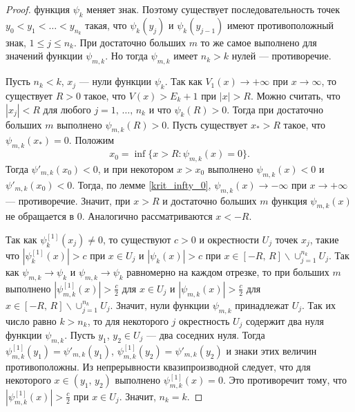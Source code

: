 \documentclass[a4paper
]{article}
\begin{document}
\begin{proof}
функция $\psi_k$ меняет знак. Поэтому существует последовательность
точек $y_0<y_1<\dots<y_{n_k}$ такая, что $\psi_k(y_j)$ и $\psi_k(y_{j-1})$
имеют противоположный знак, $1\le j\le n_k$. При достаточно больших
$m$ то же самое выполнено для значений функции $\psi_{m,k}$. Но тогда
$\psi_{m,k}$ имеет $n_k>k$ нулей --- противоречие. \par
Пусть $n_k<k$, $x_j$ --- нули функции $\psi_k$. Так как $V_1(x)
\rightarrow +\infty$ при $x\rightarrow \infty$, то существует $R>0$
такое, что $V(x)>E_k+1$ при $|x|>R$. Можно считать, что $|x_j|<R$
для любого $j=1, \, \dots, \, n_k$ и что $\psi_k(R)>0$. Тогда при
достаточно больших $m$ выполнено $\psi_{m,k}(R)>0$. Пусть существует
$x_*>R$ такое, что $\psi_{m,k}(x_*)=0$. Положим $$x_0=\inf\{x>R:
\psi _{m,k}(x)=0\}.$$ Тогда $\psi'_{m,k}(x_0)<0$, и при некотором
$x>x_0$ выполнено $\psi_{m,k}(x)<0$ и $\psi'_{m,k}(x_0)<0$.
Тогда, по лемме \ref{krit_infty_0}, $\psi_{m,k}(x)\rightarrow -\infty$ при
$x\rightarrow +\infty$ --- противоречие. Значит, при $x>R$ и
достаточно больших $m$ функция $\psi_{m,k}(x)$ не обращается в 0.
Аналогично рассматриваются $x<-R$. \par
Так как $\psi_k^{[1]}(x_j)\ne 0$, то существуют $c>0$ и окрестности
$U_j$ точек $x_j$, такие что $|\psi_k^{[1]}(x)|>c$ при $x\in U_j$ и
$|\psi_k(x)|>c$ при $x\in [-R, \, R]\backslash \cup_{j=1}^{n_k}U_j$.
Так как $\psi_{m,k}\rightarrow \psi_k$ и $\psi_{m,k}\rightarrow
\psi_k$ равномерно на каждом отрезке, то при больших $m$ выполнено
$|\psi_{m,k}^{[1]}(x)|>\frac{c}{2}$ для $x\in U_j$ и $|\psi_{m,k}(x)|
>\frac{c}{2}$ для $x\in [-R, \, R]\backslash \cup_{j=1}^{n_k}U_j$.
Значит, нули функции $\psi_{m,k}$ принадлежат $U_j$. Так их число
равно $k>n_k$, то для некоторого $j$ окрестность $U_j$ содержит два
нуля функции $\psi_{m,k}$. Пусть $y_1$, $y_2\in U_j$ --- два соседних
нуля. Тогда $\psi^{[1]}_{m,k}(y_1)=\psi'_{m,k}(y_1)$, $\psi^{[1]}_{m,k}
(y_2)=\psi'_{m,k}(y_2)$ и знаки этих величин противоположны. Из
непрерывности квазипроизводной следует, что для некоторого $x\in
(y_1, \, y_2)$ выполнено $\psi^{[1]}_{m,k}(x)=0$. Это противоречит
тому, что $|\psi^{[1]}_{m,k}(x)|>\frac{c}{2}$ при $x\in U_j$. Значит,
$n_k=k$.
\end{proof}
\end{document}
